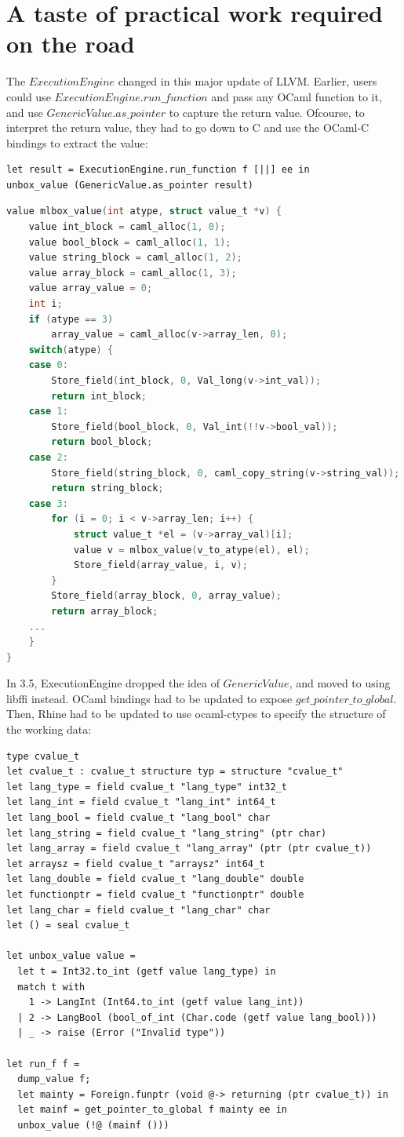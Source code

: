 \documentclass{article}
\begin{document}
\section{A taste of practical work required on the road}
The $ExecutionEngine$ changed in this major update of LLVM. Earlier,
users could use $ExecutionEngine.run\_function$ and pass any OCaml
function to it, and use $GenericValue.as\_pointer$ to capture the
return value. Ofcourse, to interpret the return value, they had to go
down to C and use the OCaml-C bindings to extract the value:
\begin{lstlisting}[language=caml]
let result = ExecutionEngine.run_function f [||] ee in
unbox_value (GenericValue.as_pointer result)
\end{lstlisting}
\begin{lstlisting}[language=c]
value mlbox_value(int atype, struct value_t *v) {
	value int_block = caml_alloc(1, 0);
	value bool_block = caml_alloc(1, 1);
	value string_block = caml_alloc(1, 2);
	value array_block = caml_alloc(1, 3);
	value array_value = 0;
	int i;
	if (atype == 3)
		array_value = caml_alloc(v->array_len, 0);
	switch(atype) {
	case 0:
		Store_field(int_block, 0, Val_long(v->int_val));
		return int_block;
	case 1:
		Store_field(bool_block, 0, Val_int(!!v->bool_val));
		return bool_block;
	case 2:
		Store_field(string_block, 0, caml_copy_string(v->string_val));
		return string_block;
	case 3:
		for (i = 0; i < v->array_len; i++) {
			struct value_t *el = (v->array_val)[i];
			value v = mlbox_value(v_to_atype(el), el);
			Store_field(array_value, i, v);
		}
		Store_field(array_block, 0, array_value);
		return array_block;
	...
	}
}
\end{lstlisting}
In 3.5, ExecutionEngine dropped the idea of $GenericValue$, and moved
to using libffi instead. OCaml bindings had to be updated to expose
$get\_pointer\_to\_global$.\\

Then, Rhine had to be updated to use ocaml-ctypes to specify the
structure of the working data:
\begin{lstlisting}[language=caml]
type cvalue_t
let cvalue_t : cvalue_t structure typ = structure "cvalue_t"
let lang_type = field cvalue_t "lang_type" int32_t
let lang_int = field cvalue_t "lang_int" int64_t
let lang_bool = field cvalue_t "lang_bool" char
let lang_string = field cvalue_t "lang_string" (ptr char)
let lang_array = field cvalue_t "lang_array" (ptr (ptr cvalue_t))
let arraysz = field cvalue_t "arraysz" int64_t
let lang_double = field cvalue_t "lang_double" double
let functionptr = field cvalue_t "functionptr" double
let lang_char = field cvalue_t "lang_char" char
let () = seal cvalue_t

let unbox_value value =
  let t = Int32.to_int (getf value lang_type) in
  match t with
    1 -> LangInt (Int64.to_int (getf value lang_int))
  | 2 -> LangBool (bool_of_int (Char.code (getf value lang_bool)))
  | _ -> raise (Error ("Invalid type"))

let run_f f =
  dump_value f;
  let mainty = Foreign.funptr (void @-> returning (ptr cvalue_t)) in
  let mainf = get_pointer_to_global f mainty ee in
  unbox_value (!@ (mainf ()))
\end{lstlisting}
\end{document}

